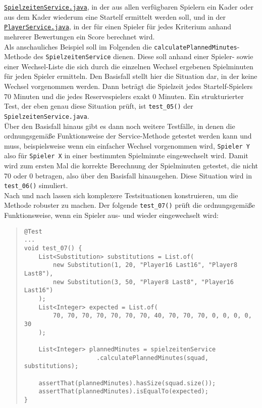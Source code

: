 \href{https://github.com/FlorianOhmes/bat_spielzeitenplaner/blob/main/spielzeitenplaner/src/main/java/de/bathesis/spielzeitenplaner/services/SpielzeitenService.java}{\texttt{SpielzeitenService.java}}, 
in der aus allen verfügbaren Spielern ein Kader oder aus dem Kader wiederum eine 
Startelf ermittelt werden soll, und in der 
\href{https://github.com/FlorianOhmes/bat_spielzeitenplaner/blob/main/spielzeitenplaner/src/main/java/de/bathesis/spielzeitenplaner/services/PlayerService.java}{\texttt{PlayerService.java}}, in der für einen Spieler 
für jedes Kriterium anhand mehrerer Bewertungen ein Score berechnet wird. \\ 
Als anschauliches Beispiel soll im Folgenden die \texttt{calculatePlannedMinutes}-Methode 
des \texttt{SpielzeitenService} dienen. Diese soll anhand einer Spieler- sowie einer 
Wechsel-Liste die sich durch die einzelnen Wechsel ergebenen Spielminuten für jeden 
Spieler ermitteln. Den Basisfall stellt hier die Situation dar, in der keine Wechsel 
vorgenommen werden. Dann beträgt die Spielzeit jedes Startelf-Spielers 70 Minuten und die 
jedes Reservespielers exakt 0 Minuten. Ein strukturierter Test, der eben genau diese 
Situation prüft, ist \texttt{test\_05()} der \texttt{SpielzeitenService.java}. \\ 
Über den Basisfall hinaus gibt es dann noch weitere Testfälle, in denen die 
ordnungsgemäße Funktionsweise der Service-Methode getestet werden kann und muss, 
beispielsweise wenn ein einfacher Wechsel vorgenommen wird, \texttt{Spieler Y} also für 
\texttt{Spieler X} in einer bestimmten Spielminute eingewechselt wird. Damit wird zum 
ersten Mal die korrekte Berechnung der Spielminuten getestet, die nicht 70 oder 0 
betragen, also über den Basisfall hinausgehen. Diese Situation wird in 
\texttt{test\_06()} simuliert. \\ 
Nach und nach lassen sich komplexere Testsituationen konstruieren, um die Methode 
robuster zu machen. Der folgende \texttt{test\_07()} prüft die ordnungsgemäße 
Funktionsweise, wenn ein Spieler aus- und wieder eingewechselt wird: 

\begin{quote}
\begin{verbatim}
@Test
...
void test_07() {
    List<Substitution> substitutions = List.of(
        new Substitution(1, 20, "Player16 Last16", "Player8 Last8"), 
        new Substitution(3, 50, "Player8 Last8", "Player16 Last16")
    );
    List<Integer> expected = List.of(
        70, 70, 70, 70, 70, 70, 70, 40, 70, 70, 70, 0, 0, 0, 0, 30
    );

    List<Integer> plannedMinutes = spielzeitenService
                    .calculatePlannedMinutes(squad, substitutions);

    assertThat(plannedMinutes).hasSize(squad.size());
    assertThat(plannedMinutes).isEqualTo(expected);
}
\end{verbatim}
\end{quote}

